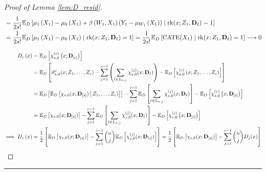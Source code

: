 \begin{proof}[Proof of Lemma \ref{lem:D_resid}]
\begin{equation}
\begin{aligned}
            & = \frac{1}{2s!}\mathbb{E}_{D}\left[
            \mu_{1}\left(X_{1}\right) - \mu_{0}\left(X_{1}\right) + \beta\left(W_{1}, X_{1}\right)\left(Y_{1} - \mu_{W_{1}}\left(X_{1}\right)\right)\; \middle| \; \operatorname{rk}(x; Z_1, \mathbf{D}_{\ell}) = 1\right]\\
            & = \frac{1}{2s!}\mathbb{E}_{D}\left[
            \mu_{1}\left(X_{1}\right) - \mu_{0}\left(X_{1}\right) \; \middle| \; \operatorname{rk}(x; Z_1, \mathbf{D}_{\ell}) = 1\right]
            = \frac{1}{2s!}\mathbb{E}_{D}\left[
            \operatorname{CATE}(X_1) \; \middle| \; \operatorname{rk}(x; Z_1, \mathbf{D}_{\ell}) = 1\right]
            \longrightarrow 0
        \end{aligned}
    \end{equation}

    \begin{equation}
        \begin{aligned}
            D_{c}\left(x\right)
            & = \mathbb{E}_{D}\left[\chi_{s,0}^{(c)}\left(x; \mathbf{D}_{[c]}\right)\right] \\
            & = \mathbb{E}_{D}\left[ \vartheta_{s,0}^{c}(x; Z_{1}, \dotsc, Z_{c}) 
        - \sum_{j = 1}^{c-1}\left(\sum_{\ell \in L_{n,j}} \chi_{s,0}^{(j)}(x; \mathbf{D}_{\ell})\right) 
        - \mathbb{E}_{D}\left[\chi_{s,0}^{(c)}\left(x; Z_{1}, \dotsc, Z_{c}\right)\right]\right] \\
        & = \mathbb{E}_{D}\left[\mathbb{E}_{D}\left[\chi_{s,0}(x; \mathbf{D}_{[s]}) \,\middle| \,  Z_{1}, \dotsc, Z_{c})\right]\right]
        - \sum_{j = 1}^{c - 1}\mathbb{E}_{D}\left[\sum_{\ell \in L_{n,j}} \chi_{s,0}^{(j)}(x; \mathbf{D}_{\ell})\right]
        - \mathbb{E}_{D}\left[\chi_{s,0}^{(c)}\left(x; \mathbf{D}_{[c]}\right)\right] \\
        & = \mathbb{E}_{D}\left[\chi_{s,0}(x; \mathbf{D}_{[s]}) \right]
        - \sum_{j = 1}^{c - 1}\mathbb{E}_{D}\left[\sum_{\ell \in L_{n,j}} \chi_{s,0}^{(j)}(x; \mathbf{D}_{\ell})\right]
        - \mathbb{E}_{D}\left[\chi_{s,0}^{(c)}\left(x; \mathbf{D}_{[c]}\right)\right] \\
        \implies D_{c}\left(x\right) 
        & = \frac{1}{2} \left[\mathbb{E}_{D}\left[\chi_{s,0}(x; \mathbf{D}_{[s]}) \right] - \sum_{j = 1}^{c - 1}\binom{n}{j}\mathbb{E}_{D}\left[\chi_{s,0}^{(j)}(x; \mathbf{D}_{[j]})\right]\right]
        = \frac{1}{2} \left[\mathbb{E}_{D}\left[\chi_{s,0}(x; \mathbf{D}_{[s]}) \right] - \sum_{j = 1}^{c - 1}\binom{n}{j}D_{j}(x)\right]
        \end{aligned}
    \end{equation}
\end{proof}

\hrule
